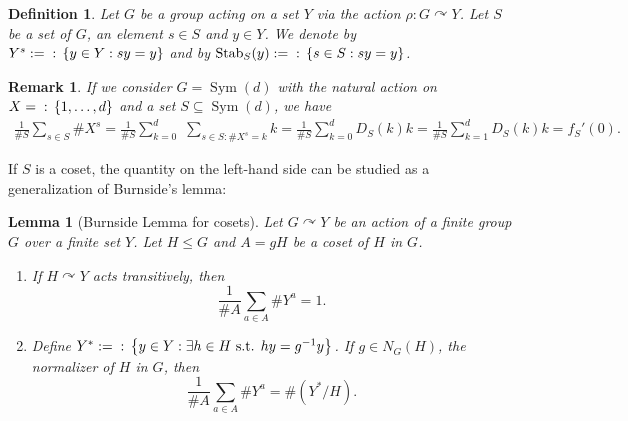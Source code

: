 \documentclass{amsart}
\def\set#1{{\def\st{\;:\;}\left\{#1\right\}}}
\DeclareMathOperator{\Stab}{Stab}
\DeclareMathOperator{\Sym}{Sym}
\DeclareMathOperator{\st}{st}
\newtheorem{Lemma}[Proposition]{Lemma}
\newtheorem{Definition}[Proposition]{Definition}
\newtheorem{Remark}[Proposition]{Remark}
\begin{document}
\begin{Definition}
Let $G$ be a group acting on a set $Y$ via the action $\rho: G \curvearrowright Y$. Let $S$ be a set of $G$, an element $s \in S$ and $y \in Y$. We denote by $Y^s := \set{y \in Y: sy = y}$ and by $\Stab_S(y) := \set{s \in S: sy = y}$. 
\end{Definition}

\begin{Remark}
If we consider $G = \Sym(d)$ with the natural action on $X = \set{1,\dots,d}$ and a set $S \subseteq \Sym(d)$, we have 
\begin{align*}
\frac{1}{\# S} \sum_{s \in S} \# X^s = \frac{1}{\# S} \sum_{k = 0}^d \,\, \sum_{s \in S: \# X^s = k} k = \frac{1}{\# S} 
\sum_{k = 0}^d D_S(k) k = \frac{1}{\# S} 
\sum_{k = 1}^d D_S(k) k = f_S'(0).
\end{align*}
\label{Remark: Burnside and derivative fS}
\end{Remark}

If $S$ is a coset, the quantity on the left-hand side can be studied as a generalization of Burnside's lemma:

\begin{Lemma}[{Burnside Lemma for cosets}]
Let $G \curvearrowright Y$ be an action of a finite group $G$ over a finite set $Y$. Let $H \leq G$ and $A = gH$ be a coset of $H$ in $G$. 

\begin{enumerate}
    \item If $H \curvearrowright Y$ acts transitively, then $$\frac{1}{\#A} \sum_{a \in A} \# Y^a = 1.$$
    \item Define $Y^* := \set{y \in Y: \exists h \in H \text{ s.t. } hy = g^{-1}y}$. If $g \in N_G(H)$, the normalizer of $H$ in $G$, then $$\frac{1}{\#A} \sum_{a \in A} \# Y^a = \#(Y^*/H).$$
\end{enumerate}
\label{lemma: Burnside cosets}
\end{Lemma}
\end{document}
